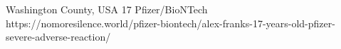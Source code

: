           {
            Washington County, USA
          }
          {
            17
          }
          {
            Pfizer/BioNTech
          }
          {
          }
          {
          }
          {
            https://nomoresilence.world/pfizer-biontech/alex-franks-17-years-old-pfizer-severe-adverse-reaction/
          }

